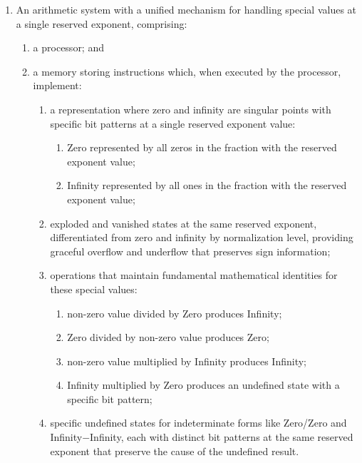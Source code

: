 \documentclass[12pt,letter]{article}
\begin{document}
\begin{enumerate}
    \item An arithmetic system with a unified mechanism for handling special values at a single reserved exponent, comprising:
        \begin{enumerate}
            \item a processor; and
            \item a memory storing instructions which, when executed by the processor, implement:
                \begin{enumerate}
                    \item a representation where zero and infinity are singular points with specific bit patterns at a single reserved exponent value:
                        \begin{enumerate}
                            \item Zero represented by all zeros in the fraction with the reserved exponent value;
                            \item Infinity represented by all ones in the fraction with the reserved exponent value;
                        \end{enumerate}
                    \item exploded and vanished states at the same reserved exponent, differentiated from zero and infinity by normalization level, providing graceful overflow and underflow that preserves sign information;
                    \item operations that maintain fundamental mathematical identities for these special values:
                        \begin{enumerate}
                            \item non-zero value divided by Zero produces Infinity;
                            \item Zero divided by non-zero value produces Zero;
                            \item non-zero value multiplied by Infinity produces Infinity;
                            \item Infinity multiplied by Zero produces an undefined state with a specific bit pattern;
                        \end{enumerate}
                    \item specific undefined states for indeterminate forms like Zero/Zero and Infinity$-$Infinity, each with distinct bit patterns at the same reserved exponent that preserve the cause of the undefined result.
                \end{enumerate}
        \end{enumerate}


\end{enumerate}
\end{document}
